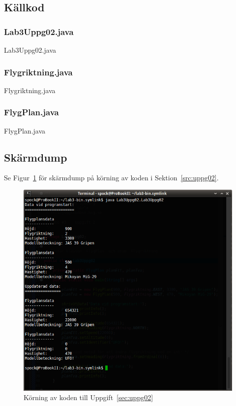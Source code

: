 \subsection{Källkod}
\subsubsection{Lab3Uppg02.java}
\caption{Lab3Uppg02.java}
\label{src:uppg02}

\subsubsection{Flygriktning.java}
\caption{Flygriktning.java}
\label{src:flygriktning}

\subsubsection{FlygPlan.java}
\caption{FlygPlan.java}
\label{src:flygplan}


\subsection{Skärmdump}
Se Figur~\ref{fig:uppg02-screenshot} för skärmdump på körning av koden i
Sektion~\ref{src:uppg02}.

\begin{figure}[htbp]
\centering
\includegraphics[width=\linewidth]{img/02.png}
\caption{Körning av koden till Uppgift~\ref{sec:uppg02}}
\label{fig:uppg02-screenshot}
\end{figure}

